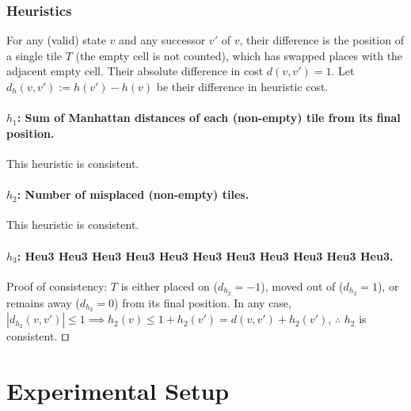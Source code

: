 \documentclass[runningheads]{llncs}
\begin{document}
\subsubsection{Heuristics}

For any (valid) state $v$ and any successor $v'$ of $v$, their difference is the position of a single tile $T$ (the empty cell is not counted), which has swapped places with the adjacent empty cell.
Their absolute difference in cost $d(v,v') = 1$.
Let $d_h(v,v') := h(v')-h(v)$ be their difference in heuristic cost.

\paragraph{$h_1$: Sum of Manhattan distances of each (non-empty) tile from its final position.}
This heuristic is consistent.

\paragraph{$h_2$: Number of misplaced (non-empty) tiles.}
This heuristic is consistent.

\paragraph{$h_3$: Heu3 Heu3 Heu3 Heu3 Heu3 Heu3 Heu3 Heu3 Heu3 Heu3 Heu3.}
Proof of consistency: $T$ is either placed on ($d_{h_2} = -1$), moved out of ($d_{h_2} = 1$), or remains away ($d_{h_2} = 0$) from its final position.
In any case, $|d_{h_2}(v,v')|\leq 1 \implies h_2(v) \leq 1+h_2(v') = d(v,v')+h_2(v')$, $\therefore$ $h_2$ is consistent. $\qed$



\section{Experimental Setup}
\end{document}
